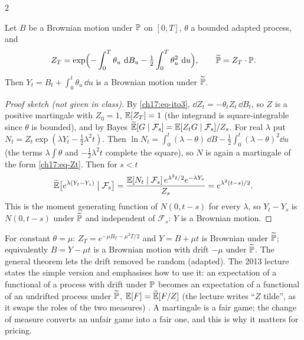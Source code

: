 \begin{paracol}{2}
\begin{theorem}\label{ch17:thm-girsanov2}
Let $B$ be a Brownian motion under $\mathbb{P}$ on $[0,T]$, $\theta$ a bounded adapted process, and
\begin{equation}\label{ch17:eq-Zt}
  Z_T=\exp\Bigl(-\int_0^T\theta_u\,\,\mathrm{d} B_u-\tfrac12\int_0^T\theta_u^2\,\,\mathrm{d} u\Bigr),\qquad \widetilde{\mathbb{P}}=Z_T\cdot\mathbb{P} .
\end{equation}
Then $Y_t=B_t+\int_0^t\theta_u\,\dd u$ is a Brownian motion under $\widetilde{\mathbb{P}}$.
\end{theorem}
\begin{proof}[Proof sketch (not given in class)]
By \eqref{ch17:eq-ito3}, $\dd Z_t=-\theta_tZ_t\,\dd B_t$, so $Z$ is a positive martingale with $Z_0=1$, $\mathbb{E}[Z_T]=1$ (the integrand is square-integrable since $\theta$ is bounded), and by Bayes $\widetilde{\mathbb{E}}[G\mid\mathcal F_s]=\mathbb{E}[Z_tG\mid\mathcal F_s]/Z_s$.
For real $\lambda$ put $N_t=Z_t\exp(\lambda Y_t-\tfrac12\lambda^2t)$. Then
$\ln N_t=\int_0^t(\lambda-\theta)\,\dd B-\tfrac12\int_0^t(\lambda-\theta)^2\dd u$ (the terms $\lambda\int\theta$ and $-\tfrac12\lambda^2t$ complete the square), so $N$ is again a martingale of the form \eqref{ch17:eq-Zt}. Then for $s<t$
\[
  \widetilde{\mathbb{E}}\bigl[e^{\lambda(Y_t-Y_s)}\bigm|\mathcal F_s\bigr]=\frac{\mathbb{E}[N_t\mid\mathcal F_s]\,e^{\lambda^2t/2}e^{-\lambda Y_s}}{Z_s}=e^{\lambda^2(t-s)/2} .
\]
This is the moment generating function of $N(0,t-s)$ for every $\lambda$, so $Y_t-Y_s$ is $N(0,t-s)$ under $\widetilde{\mathbb{P}}$ and independent of $\mathcal F_s$: $Y$ is a Brownian motion.
\end{proof}
For constant $\theta=\mu$: $Z_T=e^{-\mu B_T-\mu^2T/2}$ and $Y=B+\mu t$ is Brownian under $\widetilde{\mathbb{P}}$; equivalently $B=Y-\mu t$ is a Brownian motion with drift $-\mu$ under $\widetilde{\mathbb{P}}$. The general theorem lets the drift removed be random (adapted).
The 2013 lecture states the simple version and emphasises how to use it: an expectation of a functional of a process with drift under $\mathbb{P}$ becomes an expectation of a functional of an undrifted process under $\widetilde{\mathbb{P}}$, $\mathbb{E}[F]=\widetilde{\mathbb{E}}[F/Z]$ (the lecture writes ``$Z$ tilde'', as it swaps the roles of the two measures)
. A martingale is a fair game; the change of measure converts an unfair game into a fair one, and this is why it matters for pricing.


\end{paracol}
